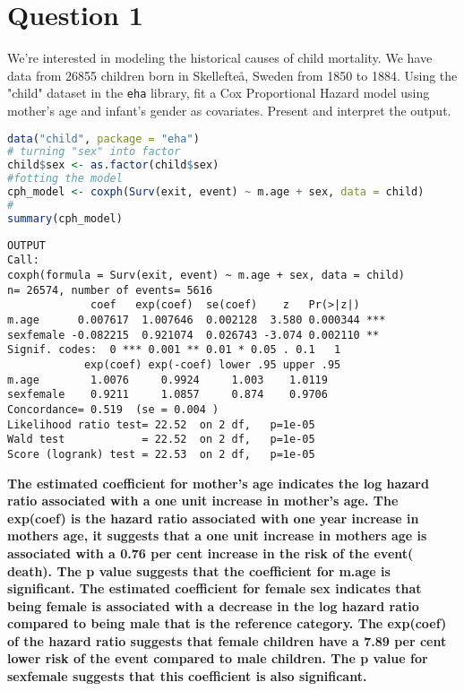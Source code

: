 \documentclass[12pt,letterpaper]{article}
\begin{document}
\section*{Question 1}
\vspace{.25cm}
\noindent We're interested in modeling the historical causes of child mortality. We have data from 26855 children born in Skellefteå, Sweden from 1850 to 1884. Using the "child" dataset in the \texttt{eha} library, fit a Cox Proportional Hazard model using mother's age and infant's gender as covariates. Present and interpret the output.
\begin{lstlisting}[language=R]
data("child", package = "eha")
# turning "sex" into factor
child$sex <- as.factor(child$sex)
#fotting the model
cph_model <- coxph(Surv(exit, event) ~ m.age + sex, data = child)
#
summary(cph_model)
\end{lstlisting}	
\begin{lstlisting}
OUTPUT
Call:
coxph(formula = Surv(exit, event) ~ m.age + sex, data = child) 
n= 26574, number of events= 5616                
             coef   exp(coef)  se(coef)    z   Pr(>|z|)    
m.age      0.007617  1.007646  0.002128  3.580 0.000344 ***
sexfemale -0.082215  0.921074  0.026743 -3.074 0.002110 ** 
Signif. codes:  0 *** 0.001 ** 0.01 * 0.05 . 0.1   1          
            exp(coef) exp(-coef) lower .95 upper .95
m.age        1.0076     0.9924     1.003    1.0119
sexfemale    0.9211     1.0857     0.874    0.9706
Concordance= 0.519  (se = 0.004 )
Likelihood ratio test= 22.52  on 2 df,   p=1e-05
Wald test            = 22.52  on 2 df,   p=1e-05
Score (logrank) test = 22.53  on 2 df,   p=1e-05
\end{lstlisting}
\textbf{The estimated coefficient for mother's age indicates the log hazard ratio associated with a one unit increase in mother's age. The exp(coef) is the hazard ratio associated with one year increase in mothers age, it suggests that a one unit increase in mothers age is associated with a 0.76 per cent increase in the risk of the event( death). The p value suggests that the coefficient for m.age is significant. The estimated coefficient for female sex indicates that being female is associated with a decrease in the log hazard ratio compared to being male that is the reference category. The exp(coef) of the hazard ratio suggests that female children have a 7.89 per cent lower risk of the event compared to male children. The p value for sexfemale suggests that this coefficient is also significant.}
\end{document}
